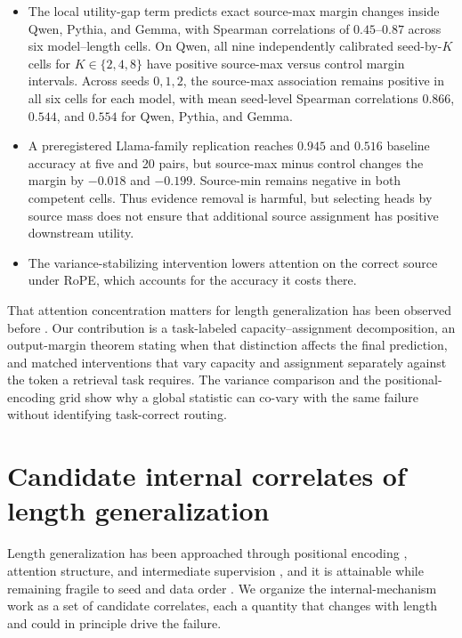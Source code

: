 \documentclass[letterpaper]{article} %
\begin{document}
\begin{itemize}
interval excludes zero. Extra source mass is not a universal benefit once routing is sufficient.
\item The local utility-gap term predicts exact source-max margin changes inside Qwen, Pythia, and Gemma,
with Spearman correlations of $0.45$--$0.87$ across six model--length cells. On Qwen, all nine independently
calibrated seed-by-$K$ cells for $K\in\{2,4,8\}$ have positive source-max versus control margin intervals.
Across seeds $0,1,2$, the source-max association remains positive in all six cells for each model, with mean
seed-level Spearman correlations $0.866$, $0.544$, and $0.554$ for Qwen, Pythia, and Gemma.
\item A preregistered Llama-family replication reaches $0.945$ and $0.516$ baseline accuracy at five and 20
pairs, but source-max minus control changes the margin by $-0.018$ and $-0.199$. Source-min remains negative
in both competent cells. Thus evidence removal is harmful, but selecting heads by source mass does not ensure
that additional source assignment has positive downstream utility.
\item The variance-stabilizing intervention lowers attention on the correct source under RoPE, which
accounts for the accuracy it costs there.
\end{itemize}

That attention concentration matters for length generalization has been observed before
\citep{nopeentropy,sparselong}.
Our contribution is a task-labeled capacity--assignment decomposition, an output-margin theorem stating
when that distinction affects the final prediction, and matched interventions that vary capacity and
assignment separately against the token a retrieval task requires.
The variance comparison and the positional-encoding grid show why a global statistic can co-vary with the
same failure without identifying task-correct routing.

\section{Candidate internal correlates of length generalization}
\label{sec:related}

Length generalization has been approached through positional encoding \citep{kazemnejad}, attention
structure, and intermediate supervision \citep{anil}, and it is attainable while remaining fragile to
seed and data order \citep{zhou2024}.
We organize the internal-mechanism work as a set of candidate correlates, each a quantity that changes with
length and could in principle drive the failure.
\end{document}
